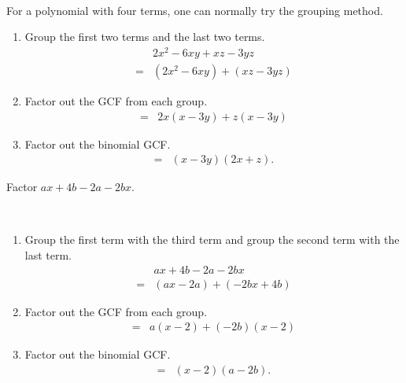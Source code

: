 \documentclass[en,11pt]{elegantbook}
\let\BeginKnitrBlock\begin \let\EndKnitrBlock\end
\begin{document}
\BeginKnitrBlock{solution}
{}~

For a polynomial with four terms, one can normally try the grouping method.

\begin{enumerate}
\def\labelenumi{\arabic{enumi}.}

\item
  Group the first two terms and the last two terms.
  \[
   \begin{aligned}
   &2x^2-6xy+xz-3yz\\
   =&(2x^2-6xy)+(xz-3yz)
   \end{aligned}
  \]
\item
  Factor out the GCF from each group.\\
  \[
   \begin{aligned}
   =&2x(x-3y)+z(x-3y)
   \end{aligned}
  \]
\item
  Factor out the binomial GCF.
  \[
   \begin{aligned}
   =&(x-3y)(2x+z).
   \end{aligned}
  \]
\end{enumerate}
\EndKnitrBlock{solution}

\BeginKnitrBlock{example}
\protect\hypertarget{exm:unnamed-chunk-12}{}{\label{exm:unnamed-chunk-12} }
Factor \(ax+4b-2a-2bx\).
\EndKnitrBlock{example}

\BeginKnitrBlock{solution}
{}\\

\begin{enumerate}
\def\labelenumi{\arabic{enumi}.}

\item
  Group the first term with the third term and group the second term with the last term.
  \[
   \begin{aligned}
   &ax+4b-2a-2bx\\
   =&(ax-2a)+(-2bx+4b)
   \end{aligned}
   \]
\item
  Factor out the GCF from each group.
  \[
   \begin{aligned}
   =&a(x-2)+(-2b)(x-2)
   \end{aligned}
   \]
\item
  Factor out the binomial GCF.
  \[
   \begin{aligned}
   =&(x-2)(a-2b).
   \end{aligned}
   \]
\end{enumerate}
\EndKnitrBlock{solution}
\end{document}
